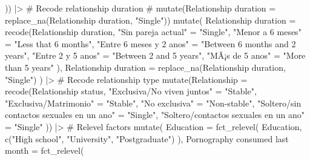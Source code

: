 \documentclass[
  bookmarksnumbered]{article}
\newenvironment{Shaded}{\begin{snugshade}}{\end{snugshade}}
\newcommand{\AttributeTok}[1]{\textcolor[rgb]{0.80,0.80,0.80}{#1}}
\newcommand{\CommentTok}[1]{\textcolor[rgb]{0.50,0.62,0.50}{#1}}
\newcommand{\FunctionTok}[1]{\textcolor[rgb]{0.94,0.94,0.56}{#1}}
\newcommand{\NormalTok}[1]{\textcolor[rgb]{0.80,0.80,0.80}{#1}}
\newcommand{\OtherTok}[1]{\textcolor[rgb]{0.94,0.94,0.56}{#1}}
\newcommand{\SpecialCharTok}[1]{\textcolor[rgb]{0.86,0.64,0.64}{#1}}
\newcommand{\StringTok}[1]{\textcolor[rgb]{0.80,0.58,0.58}{#1}}
\begin{document}
\begin{Shaded}
\begin{Highlighting}[]
\NormalTok{  )) }\SpecialCharTok{|\textgreater{}}
  \CommentTok{\# Recode relationship duration}
  \CommentTok{\# mutate(\textasciigrave{}Relationship duration\textasciigrave{} = replace\_na(\textasciigrave{}Relationship duration\textasciigrave{}, "Single"))}
  \FunctionTok{mutate}\NormalTok{(}
    \StringTok{\textasciigrave{}}\AttributeTok{Relationship duration}\StringTok{\textasciigrave{}} \OtherTok{=} \FunctionTok{recode}\NormalTok{(}\StringTok{\textasciigrave{}}\AttributeTok{Relationship duration}\StringTok{\textasciigrave{}}\NormalTok{,}
      \StringTok{"Sin pareja actual"} \OtherTok{=} \StringTok{"Single"}\NormalTok{,}
      \StringTok{"Menor a 6 meses"} \OtherTok{=} \StringTok{"Less that 6 months"}\NormalTok{,}
      \StringTok{"Entre 6 meses y 2 anos"} \OtherTok{=} \StringTok{"Between 6 months and 2 years"}\NormalTok{,}
      \StringTok{"Entre 2 y 5 anos"} \OtherTok{=} \StringTok{"Between 2 and 5 years"}\NormalTok{,}
      \StringTok{"MÃ¡s de 5 anos"} \OtherTok{=} \StringTok{"More than 5 years"}
\NormalTok{    ),}
    \StringTok{\textasciigrave{}}\AttributeTok{Relationship duration}\StringTok{\textasciigrave{}} \OtherTok{=} \FunctionTok{replace\_na}\NormalTok{(}\StringTok{\textasciigrave{}}\AttributeTok{Relationship duration}\StringTok{\textasciigrave{}}\NormalTok{, }\StringTok{"Single"}\NormalTok{)}
\NormalTok{  ) }\SpecialCharTok{|\textgreater{}}
  \CommentTok{\# Recode relationship type}
  \FunctionTok{mutate}\NormalTok{(}\AttributeTok{Relationship =} \FunctionTok{recode}\NormalTok{(}\StringTok{\textasciigrave{}}\AttributeTok{Relationship status}\StringTok{\textasciigrave{}}\NormalTok{,}
    \StringTok{"Exclusiva/No viven juntos"} \OtherTok{=} \StringTok{"Stable"}\NormalTok{,}
    \StringTok{"Exclusiva/Matrimonio"} \OtherTok{=} \StringTok{"Stable"}\NormalTok{,}
    \StringTok{"No exclusiva"} \OtherTok{=} \StringTok{"Non{-}stable"}\NormalTok{,}
    \StringTok{"Soltero/sin contactos sexuales en un ano"} \OtherTok{=} \StringTok{"Single"}\NormalTok{,}
    \StringTok{"Soltero/contactos sexuales en un ano"} \OtherTok{=} \StringTok{"Single"}
\NormalTok{  )) }\SpecialCharTok{|\textgreater{}}
  \CommentTok{\# Relevel factors}
  \FunctionTok{mutate}\NormalTok{(}
    \AttributeTok{Education =} \FunctionTok{fct\_relevel}\NormalTok{(}
\NormalTok{      Education,}
      \FunctionTok{c}\NormalTok{(}\StringTok{"High school"}\NormalTok{, }\StringTok{"University"}\NormalTok{, }\StringTok{"Postgraduate"}\NormalTok{)}
\NormalTok{    ),}
    \StringTok{\textasciigrave{}}\AttributeTok{Pornography consumed last month}\StringTok{\textasciigrave{}} \OtherTok{=} \FunctionTok{fct\_relevel}\NormalTok{(}

\end{Highlighting}
\end{Shaded}
\end{document}
